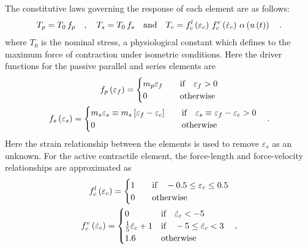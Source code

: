 \documentclass[]{scrartcl}
\begin{document}
The constitutive laws governing the response of each element are as follows:
\begin{gather}
T_{p}
  = T_{0} \,  f_{p}
\quad , \quad
T_{s}
  = T_{0} \,  f_{s}
\quad \textnormal{and} \quad
T_{c}
  = f_{c}^{l} \left( \varepsilon_{c} \right) \, f_{c}^{v} \left( \dot{\varepsilon}_{c} \right) \, \alpha\left( u \left( t \right) \right)
\quad .
\end{gather}
where $T_{0}$ is the nominal stress, a physiological constant which defines to the maximum force of contraction under isometric conditions. 
Here the driver functions for the passive parallel and series elements are
\begin{gather}
f_{p} \left( \varepsilon_{f} \right)
  = \begin{cases}
  m_{p} \varepsilon_{f} \quad &\textnormal{if} \quad \varepsilon_{f} > 0 \\
  0 \quad &\textnormal{otherwise}
  \end{cases}
\\
f_{s} \left( \varepsilon_{s} \right)
  = \begin{cases}
  m_{s} \varepsilon_{s} \equiv m_{s} \left[ \varepsilon_{f} - \varepsilon_{c} \right]  \quad &\textnormal{if} \quad \varepsilon_{s} \equiv \varepsilon_{f} - \varepsilon_{c} > 0 \\
  0 \quad &\textnormal{otherwise}
  \end{cases}
\quad .
\end{gather}
Here the strain relationship between the elements is used to remove $\varepsilon_{s}$ as an unknown.
For the active contractile element, the force-length and force-velocity relationships are approximated as
\begin{gather}
f_{c}^{l} \left( \varepsilon_{c} \right) 
  = \begin{cases}
  1 \quad &\textnormal{if} \quad -0.5 \leq \varepsilon_{c} \leq 0.5 \\
  0 \quad &\textnormal{otherwise}
  \end{cases}
\\
f_{c}^{v} \left( \dot{\varepsilon}_{c} \right)
  = \begin{cases}
  0 &\textnormal{if} \quad \dot{\varepsilon}_{c} < -5 \\
  \frac{1}{5} \dot{\varepsilon}_{c} + 1 &\textnormal{if} \quad  -5 \leq \dot{\varepsilon}_{c} < 3 \\
  1.6 \quad &\textnormal{otherwise}
  \end{cases}
\quad ,
\end{gather}
\end{document}

